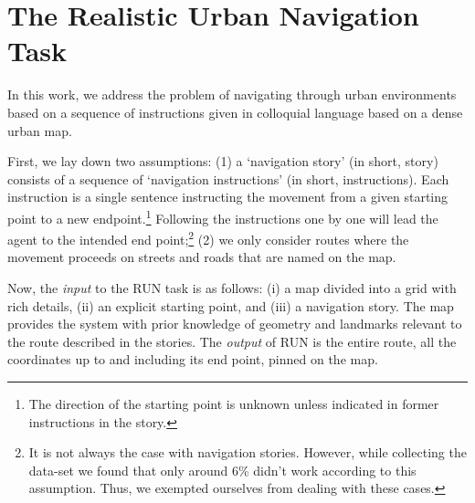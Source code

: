\documentclass[11pt,a4paper]{article}
\begin{document}
\section{The Realistic Urban Navigation  Task}
\label{task}

In this work, we address the problem of navigating through urban environments based on a sequence of instructions given  in colloquial language based on a  dense  urban map. 


First, we lay down two assumptions: (1) a  \enquote*{navigation story}  (in short, story) consists of a sequence of \enquote*{navigation instructions} (in short, instructions). Each instruction is a single sentence instructing the movement from a given starting point to a new endpoint.\footnote{The direction of the starting point is unknown unless indicated in former instructions in the story.}
Following the instructions one by one will lead the agent to the intended end point;\footnote{It is not always the case with navigation stories. However, while collecting the data-set we found that only around 6\% didn't work according to this assumption. Thus, we exempted ourselves from dealing with these cases.} (2) we only consider routes where the movement proceeds on streets and roads that are named on the map.



Now, the {\em input} to the RUN task is as follows: 
(i)
    a map divided into a grid with rich details,
(ii)
    an explicit starting point, and
(iii)
    a navigation story.
The map provides the system with prior knowledge of geometry and landmarks relevant to the route described in the stories. 
The {\em output} of RUN is the entire route,  all the coordinates up to and including its end point, pinned on the map.
\end{document}
